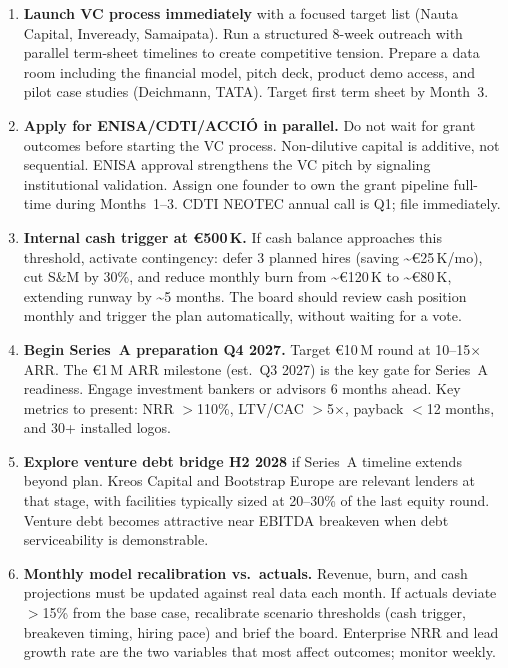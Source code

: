 \documentclass[11pt,a4paper]{article}
\begin{document}
\begin{enumerate}
\item \textbf{Launch VC process immediately} with a focused target list (Nauta Capital, Inveready, Samaipata). Run a structured 8-week outreach with parallel term-sheet timelines to create competitive tension. Prepare a data room including the financial model, pitch deck, product demo access, and pilot case studies (Deichmann, TATA). Target first term sheet by Month~3.
\item \textbf{Apply for ENISA/CDTI/ACCI\'O in parallel.} Do not wait for grant outcomes before starting the VC process. Non-dilutive capital is additive, not sequential. ENISA approval strengthens the VC pitch by signaling institutional validation. Assign one founder to own the grant pipeline full-time during Months~1--3. CDTI NEOTEC annual call is Q1; file immediately.
\item \textbf{Internal cash trigger at \euro{}500\,K.} If cash balance approaches this threshold, activate contingency: defer 3 planned hires (saving \textasciitilde\euro{}25\,K/mo), cut S\&M by 30\%, and reduce monthly burn from \textasciitilde\euro{}120\,K to \textasciitilde\euro{}80\,K, extending runway by \textasciitilde5 months. The board should review cash position monthly and trigger the plan automatically, without waiting for a vote.
\item \textbf{Begin Series~A preparation Q4 2027.} Target \euro{}10\,M round at 10--15$\times$ ARR. The \euro{}1\,M ARR milestone (est.\ Q3 2027) is the key gate for Series~A readiness. Engage investment bankers or advisors 6 months ahead. Key metrics to present: NRR $>$110\%, LTV/CAC $>$5$\times$, payback $<$12 months, and 30+ installed logos.
\item \textbf{Explore venture debt bridge H2 2028} if Series~A timeline extends beyond plan. Kreos Capital and Bootstrap Europe are relevant lenders at that stage, with facilities typically sized at 20--30\% of the last equity round. Venture debt becomes attractive near EBITDA breakeven when debt serviceability is demonstrable.
\item \textbf{Monthly model recalibration vs.\ actuals.} Revenue, burn, and cash projections must be updated against real data each month. If actuals deviate $>$15\% from the base case, recalibrate scenario thresholds (cash trigger, breakeven timing, hiring pace) and brief the board. Enterprise NRR and lead growth rate are the two variables that most affect outcomes; monitor weekly.
\end{enumerate}
\end{document}
